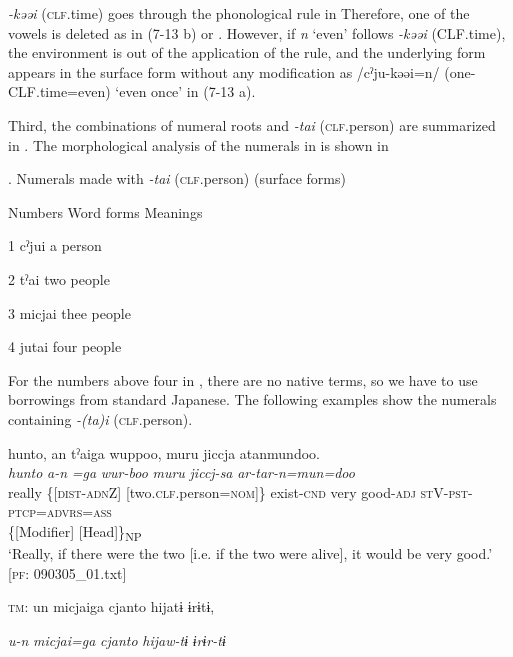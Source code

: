 \textit{{}-kəəi} (\textsc{clf}.time) goes through the phonological rule in  Therefore, one of the vowels is deleted as in (7-13 b) or . However, if \textit{n} ‘even’ follows \textit{{}-kəəi} (CLF.time), the environment is out of the application of the rule, and the underlying form appears in the surface form without any modification as /cˀju-kəəi=n/ (one-CLF.time=even) ‘even once’ in (7-13 a).

Third, the combinations of numeral roots and \textit{{}-tai} (\textsc{clf}.person) are summarized in . The morphological analysis of the numerals in  is shown in 

\begin{styleBeschriftung}
\textmd{}\textmd{. Numerals made with}\textmd{ \textit{-tai} }\textmd{(\textsc{clf}.person) (surface forms)}
\end{styleBeschriftung}

Numbers  Word forms  Meanings

1  cˀjui  a person

2  tˀai  two people

3  micjai  thee people

4  jutai  four people

For the numbers above four in , there are no native terms, so we have to use borrowings from standard Japanese. The following examples show the numerals containing \textit{{}-(ta)i} (\textsc{clf}.person).

\ea \label{ex:7:14}
\ea \label{ex:7:14a}
\gllll  hunto,  an  tˀaiga  wuppoo,  muru   jiccja  atanmundoo.\\
\textit{hunto}  \textit{a-n}  \textit{=ga}  \textit{wur-boo}  \textit{muru}  \textit{jiccj-sa}  \textit{ar-tar-n=mun=doo}\\
really  \{[\textsc{dist}-\textsc{adn}Z]  [two.\textsc{clf}.person=\textsc{nom}]\}  exist-\textsc{cnd}  very   good-\textsc{adj}  \textsc{st}V-\textsc{pst}-\textsc{ptcp}=\textsc{advrs}=\textsc{ass}\\
\{[Modifier]  [Head]\}\textsubscript{NP}    \\
\glt ‘Really, if there were the two [i.e. if the two were alive], it would be very good.’ [\textsc{pf}: 090305\_01.txt]

\ex \label{ex:7:14b}\textsc{tm}:  un  micjaiga  {\textbar}cjanto{\textbar}  hijatɨ  ɨrɨtɨ,

      \textit{u-n}  \textit{micjai=ga}  \textit{cjanto}  \textit{hijaw-tɨ}      \textit{ɨrɨr-tɨ}
                                                                             
